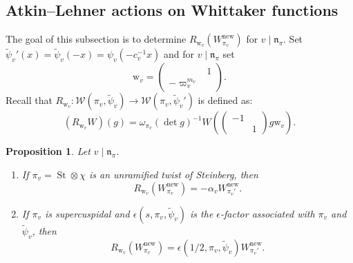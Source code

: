 \documentclass[10pt, twoside]{amsart}
\theoremstyle{plain}
\newtheorem{proposition}[theorem]{Proposition}
\theoremstyle{definition}
\theoremstyle{remark}
\numberwithin{equation}{subsection}
\def\new{\mathrm{new}}
\def\gn{\mathfrak n}
\def\calw{\mathcal W}
\def\St{\operatorname{St}}
\newcommand{\mat}[4]{\begin{pmatrix}#1&#2\\#3&#4\end{pmatrix}}
\begin{document}
\subsection{Atkin--Lehner actions on Whittaker functions}\label{subsec:AL-actions}
The goal of this subsection is to determine $R_{{ \boldsymbol{\mathrm{w}}}_v}(W_{\pi_v}^{\new})$ for $v \mid \gn_{\pi}$. Set $\widetilde \psi_v'(x) = \widetilde \psi_v(-x) = \psi_v(-c_v^{-1}x)$ and for $v \mid \gn_{\pi}$ set
\begin{equation*}
{ \boldsymbol{\mathrm{w}}}_v = \begin{pmatrix} & 1 \\ -\varpi_v^{m_v} \end{pmatrix}.
\end{equation*}
Recall that $R_{{ \boldsymbol{\mathrm{w}}}_v}: \calw(\pi_v,\widetilde\psi_v) \rightarrow \calw(\pi_v,\widetilde \psi_v')$ is defined as:
\begin{equation*}
(R_{{ \boldsymbol{\mathrm{w}}}_v}W)(g) = \omega_{\pi_v}(\det g)^{-1} W\left(\mat {-1}{}{}{1} g { \boldsymbol{\mathrm{w}}}_v\right).
\end{equation*}

\begin{proposition}\label{prop: Atkin-Lehner-twist-vs-normalised-new-vector}
Let $v \mid \gn_{\pi}$.
\begin{enumerate}[label=(\roman*)]
\item If $\pi_v = \St \otimes \chi$ is an unramified twist of Steinberg, then\label{enum-part:prop:AL-new-vector-ST}
\begin{equation*}
R_{{ \boldsymbol{\mathrm{w}}}_v}(W_{\pi_v}^{\new}) = -\alpha_v W_{\pi_v'}^{\new}.
\end{equation*}
\item If $\pi_v$ is supercuspidal and $\epsilon(s,\pi_v,\widetilde\psi_v)$ is the $\epsilon$-factor associated with $\pi_v$ and $\widetilde \psi_v$, then\label{enum-part:prop:AL-new-vector-super}
\begin{equation*}
R_{{ \boldsymbol{\mathrm{w}}}_v}(W_{\pi_v}^{\new}) = \epsilon (1/2, \pi_v, \widetilde\psi_v) W_{\pi_v'}^{\new}.
\end{equation*}
\end{enumerate}
\end{proposition}
\end{document}
